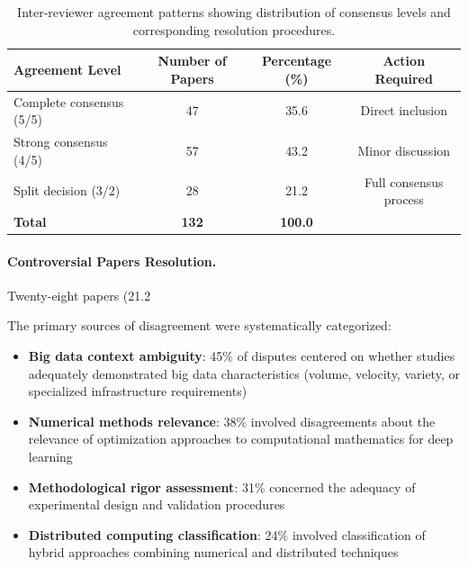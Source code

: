 \documentclass[acmsmall]{acmart}
\begin{document}
\begin{table}[!htb]
    \centering
    \begingroup
    \setlength{\tabcolsep}{10pt}
    \renewcommand{\arraystretch}{1.3}
    \begin{tabular}{lccc}
        \toprule
        \textbf{Agreement Level} & \textbf{Number of Papers} & \textbf{Percentage (\%)} & \textbf{Action Required} \\
        \midrule
        Complete consensus (5/5) & 47 & 35.6 & Direct inclusion \\
        Strong consensus (4/5) & 57 & 43.2 & Minor discussion \\
        Split decision (3/2) & 28 & 21.2 & Full consensus process \\
        \midrule
        \textbf{Total} & \textbf{132} & \textbf{100.0} & \\
        \bottomrule
    \end{tabular}
    \endgroup
    \caption{Inter-reviewer agreement patterns showing distribution of consensus levels and corresponding resolution procedures.}
    \label{tab:consensus_analysis}
\end{table}

\paragraph{Controversial Papers Resolution.} Twenty-eight papers (21.2%

The primary sources of disagreement were systematically categorized:
\begin{itemize}
    \item \textbf{Big data context ambiguity}: 45\% of disputes centered on whether studies adequately demonstrated big data characteristics (volume, velocity, variety, or specialized infrastructure requirements)
    \item \textbf{Numerical methods relevance}: 38\% involved disagreements about the relevance of optimization approaches to computational mathematics for deep learning
    \item \textbf{Methodological rigor assessment}: 31\% concerned the adequacy of experimental design and validation procedures
    \item \textbf{Distributed computing classification}: 24\% involved classification of hybrid approaches combining numerical and distributed techniques
\end{itemize}
\end{document}
